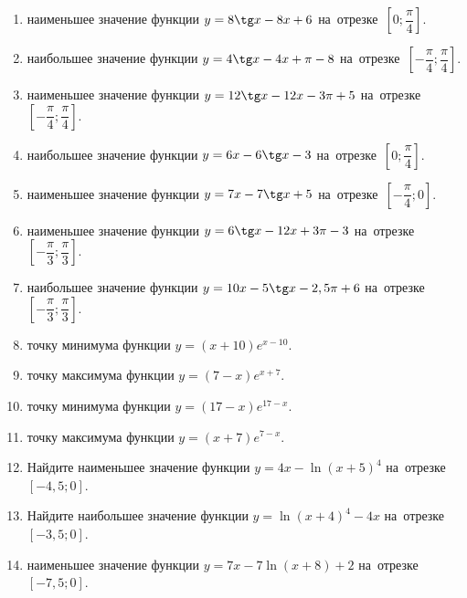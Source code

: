\documentclass[a4paper,10pt]{article}
\begin{document}
\begin{enumerate}
\item {} наименьшее значение функции $y=8\tg x-8x+6$ на~отрезке~$\left[0;\dfrac{\pi }{4}\right]$.

\item {} наибольшее значение функции $y=4\tg x-4x+\pi -8$ на~отрезке~$\left[-\dfrac{\pi }{4};\dfrac{\pi }{4}\right]$.

\item {} наименьшее значение функции $y=12\tg x-12x-3\pi +5$ на~отрезке~$\left[-\dfrac{\pi }{4};\dfrac{\pi }{4}\right]$.

\item {} наибольшее значение функции $y=6x-6\tg x-3$ на~отрезке~$\left[0;\dfrac{\pi }{4}\right]$.

\item {} наименьшее значение функции $y=7x-7\tg x+5$ на~отрезке~$\left[-\dfrac{\pi }{4};0\right]$.

\item {} наименьшее значение функции $y=6\tg x-12x+3\pi -3$ на~отрезке~$\left[-\dfrac{\pi }{3};\dfrac{\pi }{3}\right]$.

\item {} наибольшее значение функции $y=10x-5\tg x-2,5\pi +6$ на~отрезке~$\left[-\dfrac{\pi }{3};\dfrac{\pi }{3}\right]$.

\item {} точку минимума функции $y=\left(x+10\right)e^{x-10}$.

\item {} точку максимума функции $y=\left(7-x\right)e^{x+7}$.

\item {} точку минимума функции $y=\left(17-x\right)e^{17-x}$.

\item {} точку максимума функции $y=\left(x+7\right)e^{7-x}$.

\item Найдите наименьшее значение функции $y=4x-\ln \left(x+5\right)^4$ на~отрезке~$\left[-4,5;0\right]$.

\item Найдите наибольшее значение функции $y=\ln \left(x+4\right)^4-4x$ на~отрезке~$\left[-3,5;0\right]$.

\item {} наименьшее значение функции $y=7x-7\ln \left(x+8\right)+2$ на~отрезке~$\left[-7,5;0\right]$.


\end{enumerate}
\end{document}
